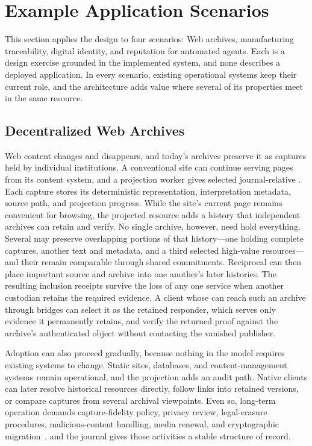 \section{Example Application Scenarios}
\label{sec:applications}

This section applies the design to four scenarios: Web archives, manufacturing traceability, digital identity, and reputation for automated agents. Each is a design exercise grounded in the implemented system, and none describes a deployed application. In every scenario, existing operational systems keep their current role, and the architecture adds value where several of its properties meet in the same resource.

\subsection{Decentralized Web Archives}

Web content changes and disappears, and today's archives preserve it as captures held by individual institutions. A conventional site can continue serving pages from its content system, and a projection worker gives selected  journal-relative . Each capture stores its deterministic representation, interpretation metadata, source path, and projection progress. While the site's current page remains convenient for browsing, the projected resource adds a history that independent archives can retain and verify. No single archive, however, need hold everything. Several may preserve overlapping portions of that history---one holding complete captures, another text and metadata, and a third selected high-value resources---and their  remain comparable through shared commitments. Reciprocal  can then place important source and archive  into one another's later histories. The resulting inclusion receipts survive the loss of any one service when another custodian retains the required evidence. A client whose  can reach such an archive through bridges can select it as the retained responder, which serves only evidence it permanently retains, and verify the returned proof against the archive's authenticated object without contacting the vanished publisher.

Adoption can also proceed gradually, because nothing in the model requires existing systems to change. Static sites, databases, and content-management systems remain operational, and the projection adds an audit path. Native clients can later resolve historical resources directly, follow links into retained versions, or compare captures from several archival viewpoints. Even so, long-term operation demands capture-fidelity policy, privacy review, legal-erasure procedures, malicious-content handling, media renewal, and cryptographic migration~\cite{Chun2009tiered}, and the journal gives those activities a stable structure of record.

